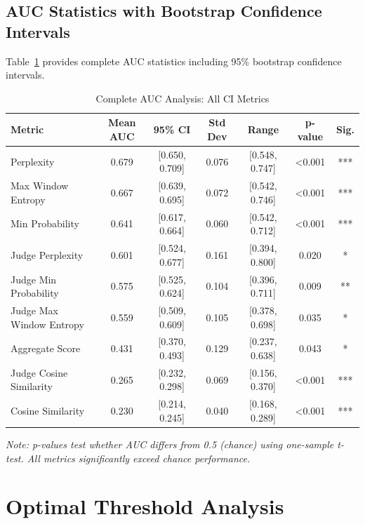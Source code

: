 \subsection{AUC Statistics with Bootstrap Confidence Intervals}

Table~\ref{tab:rq2_full_auc} provides complete AUC statistics including 95\% bootstrap confidence intervals.

\begin{table}[h]
\centering
\small
\caption{Complete AUC Analysis: All CI Metrics}
\label{tab:rq2_full_auc}
\begin{tabular}{lcccccc}
\toprule
\textbf{Metric} & \textbf{Mean AUC} & \textbf{95\% CI} & \textbf{Std Dev} & \textbf{Range} & \textbf{p-value} & \textbf{Sig.} \\
\midrule
Perplexity                & 0.679 & [0.650, 0.709] & 0.076 & [0.548, 0.747] & <0.001 & *** \\
Max Window Entropy        & 0.667 & [0.639, 0.695] & 0.072 & [0.542, 0.746] & <0.001 & *** \\
Min Probability           & 0.641 & [0.617, 0.664] & 0.060 & [0.542, 0.712] & <0.001 & *** \\
Judge Perplexity          & 0.601 & [0.524, 0.677] & 0.161 & [0.394, 0.800] & 0.020  & *   \\
Judge Min Probability     & 0.575 & [0.525, 0.624] & 0.104 & [0.396, 0.711] & 0.009  & **  \\
Judge Max Window Entropy  & 0.559 & [0.509, 0.609] & 0.105 & [0.378, 0.698] & 0.035  & *   \\
Aggregate Score           & 0.431 & [0.370, 0.493] & 0.129 & [0.237, 0.638] & 0.043  & *   \\
Judge Cosine Similarity   & 0.265 & [0.232, 0.298] & 0.069 & [0.156, 0.370] & <0.001 & *** \\
Cosine Similarity         & 0.230 & [0.214, 0.245] & 0.040 & [0.168, 0.289] & <0.001 & *** \\
\bottomrule
\end{tabular}
\end{table}

\textit{Note: p-values test whether AUC differs from 0.5 (chance) using one-sample t-test. All metrics significantly exceed chance performance.}

\section{Optimal Threshold Analysis}

